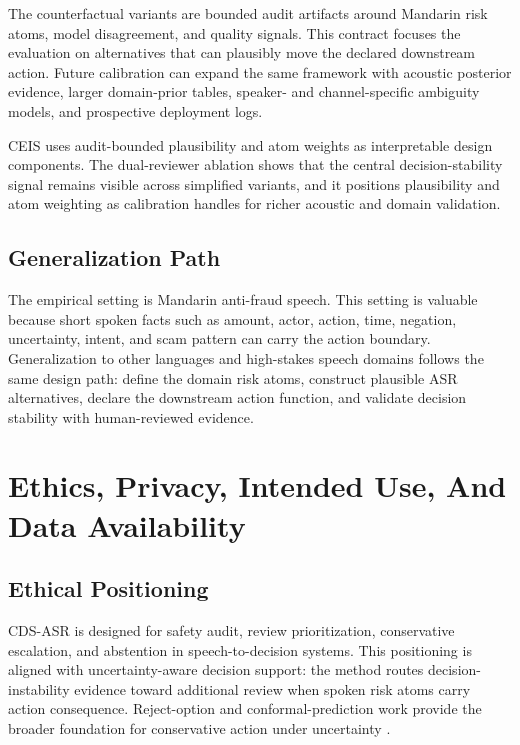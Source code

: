 The counterfactual variants are bounded audit artifacts around Mandarin risk atoms, model disagreement, and quality signals. This contract focuses the evaluation on alternatives that can plausibly move the declared downstream action. Future calibration can expand the same framework with acoustic posterior evidence, larger domain-prior tables, speaker- and channel-specific ambiguity models, and prospective deployment logs.

CEIS uses audit-bounded plausibility and atom weights as interpretable design components. The dual-reviewer ablation shows that the central decision-stability signal remains visible across simplified variants, and it positions plausibility and atom weighting as calibration handles for richer acoustic and domain validation.

\subsection{Generalization Path}

The empirical setting is Mandarin anti-fraud speech. This setting is valuable because short spoken facts such as amount, actor, action, time, negation, uncertainty, intent, and scam pattern can carry the action boundary. Generalization to other languages and high-stakes speech domains follows the same design path: define the domain risk atoms, construct plausible ASR alternatives, declare the downstream action function, and validate decision stability with human-reviewed evidence.

\section{Ethics, Privacy, Intended Use, And Data Availability}

\subsection{Ethical Positioning}

CDS-ASR is designed for safety audit, review prioritization, conservative escalation, and abstention in speech-to-decision systems. This positioning is aligned with uncertainty-aware decision support: the method routes decision-instability evidence toward additional review when spoken risk atoms carry action consequence. Reject-option and conformal-prediction work provide the broader foundation for conservative action under uncertainty \citep{chow1970reject,angelopoulos2021conformal}.

